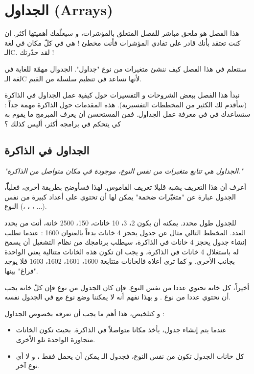 \chapter{الجداول (\textenglish{Arrays})}

هذا الفصل هو ملحق مباشر للفصل المتعلق بالمؤشرات، و سيعلّمك أهميتها أكثر. إن كنت تعتقد بأنك قادر على تفادي المؤشرات فأنت مخطئ ! هي في كلّ مكان في لغة الـ\textenglish{C}. لقد حذّرتك !

سنتعلم في هذا الفصل كيف ننشئ متغيرات من نوع "جداول". الجدوال مهمّة للغاية في لغة الـ\textenglish{C} لأنها تساعد في تنظيم سلسلة من القيم.

نبدأ هذا الفصل ببعض الشروحات و التفسيرات حول كيفية عمل الجداول في الذاكرة (سأقدم لك الكثير من المخططات التفسيرية). هذه المقدمات حول الذاكرة مهمة جداً : ستساعدك في في معرفة عمل الجداول. فمن المستحسن أن يعرف المبرمج ما يقوم به كي يتحكم في برامجه أكثر، أليس كذلك ؟

\section{الجداول في الذاكرة}

\textit{"الجداول هي تتابع متغيرات من نفس النوع، موجودة في مكان متواصل من الذاكرة."}

أعرف أن هذا التعريف يشبه قليلا تعريف القاموس. لهذا فسأوضح بطريقة أخرى، فعلياّّ، الجدول عبارة عن "متغيّرات ضخمة" يمكن لها أن تحتوي على أعداد كبيرة من نفس النوع
(،
،
،
...).

للجدول طول محدد. يمكنه أن يكون 2، 3، 10 خانات، 150، 2500 خانة، أنت من يحدد العدد. المخطط التالي مثال عن جدول يحجز 4 خانات بدءاً بالعنوان 1600 :
عندما تطلب إنشاء جدول يحجز 4 خانات في الذاكرة، سيطلب برنامجك من نظام التشغيل أن يسمح له باستغلال 4 خانات في الذاكرة، و يجب ان تكون هذه الخانات متتالية يعني الواحدة بجانب الأخرى. و كما ترى أعلاه فالخانات متتابعة 1600، 1601، 1602، 1603 فلا يوجد "فراغ" بينها.

أخيراً، كل خانة تحتوي عددا من نفس النوع. فإن كان الجدول من نوع
فإن كلّ خانة يجب أن تحتوي عددا من نوع
.
و بهذا نفهم أنه لا يمكننا وضع نوع
مع
في الجدول نفسه.

و كتلخيص، هذا أهم ما يجب أن تعرفه بخصوص الجداول :
\begin{itemize}
  \item عندما يتم إنشاء جدول، يأخذ مكانا متواصلاً في الذاكرة. بحيث تكون الخانات متجاورة الواحدة تلو الأخرى.
  \item كل خانات الجدول تكون من نفس النوع، فجدول
الـ
يمكن أن يحمل فقط
،
و لا أي نوع آخر.
\end{itemize}

